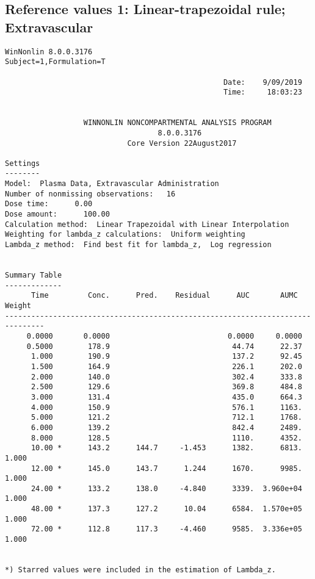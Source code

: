 \documentclass[12pt,a4paper]{article}
\begin{document}
\subsection{Reference values 1: Linear-trapezoidal rule; Extravascular}
\begin{verbatim}
WinNonlin 8.0.0.3176
Subject=1,Formulation=T

                                                  Date:    9/09/2019
                                                  Time:     18:03:23


                  WINNONLIN NONCOMPARTMENTAL ANALYSIS PROGRAM
                                   8.0.0.3176
                            Core Version 22August2017

Settings
--------
Model:  Plasma Data, Extravascular Administration
Number of nonmissing observations:   16
Dose time:      0.00
Dose amount:      100.00
Calculation method:  Linear Trapezoidal with Linear Interpolation
Weighting for lambda_z calculations:  Uniform weighting
Lambda_z method:  Find best fit for lambda_z,  Log regression


Summary Table
-------------
      Time         Conc.      Pred.    Residual      AUC       AUMC      Weight
-------------------------------------------------------------------------------
     0.0000       0.0000                           0.0000     0.0000
     0.5000        178.9                            44.74      22.37
      1.000        190.9                            137.2      92.45
      1.500        164.9                            226.1      202.0
      2.000        140.0                            302.4      333.8
      2.500        129.6                            369.8      484.8
      3.000        131.4                            435.0      664.3
      4.000        150.9                            576.1      1163.
      5.000        121.2                            712.1      1768.
      6.000        139.2                            842.4      2489.
      8.000        128.5                            1110.      4352.
      10.00 *      143.2      144.7     -1.453      1382.      6813.      1.000
      12.00 *      145.0      143.7      1.244      1670.      9985.      1.000
      24.00 *      133.2      138.0     -4.840      3339.  3.960e+04      1.000
      48.00 *      137.3      127.2      10.04      6584.  1.570e+05      1.000
      72.00 *      112.8      117.3     -4.460      9585.  3.336e+05      1.000


*) Starred values were included in the estimation of Lambda_z.



\end{verbatim}
\end{document}
